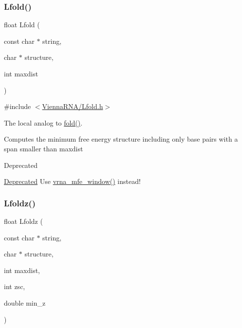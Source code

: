 \subsubsection{\texorpdfstring{Lfold()}{Lfold()}}
{\footnotesize\ttfamily float Lfold (\begin{DoxyParamCaption}\item[{const char $\ast$}]{string,  }\item[{char $\ast$}]{structure,  }\item[{int}]{maxdist }\end{DoxyParamCaption})}



{\ttfamily \#include $<$\hyperlink{Lfold_8h}{Vienna\+R\+N\+A/\+Lfold.\+h}$>$}



The local analog to \hyperlink{group__mfe__fold__single_gaadafcb0f140795ae62e5ca027e335a9b}{fold()}. 

Computes the minimum free energy structure including only base pairs with a span smaller than \textquotesingle{}maxdist\textquotesingle{}

\begin{DoxyRefDesc}{Deprecated}
\item[\hyperlink{deprecated__deprecated000086}{Deprecated}]Use \hyperlink{group__local__mfe__fold_ga689df235a1915a1ad56e377383c044ce}{vrna\+\_\+mfe\+\_\+window()} instead! \end{DoxyRefDesc}
\mbox{\label{group__local__mfe__fold_gab6d79eecc180f586679f7b85cce5cbe9}} 
\subsubsection{\texorpdfstring{Lfoldz()}{Lfoldz()}}
{\footnotesize\ttfamily float Lfoldz (\begin{DoxyParamCaption}\item[{const char $\ast$}]{string,  }\item[{char $\ast$}]{structure,  }\item[{int}]{maxdist,  }\item[{int}]{zsc,  }\item[{double}]{min\+\_\+z }\end{DoxyParamCaption})}



